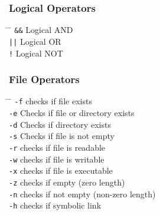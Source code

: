 \documentclass[a4paper,10pt]{article}
\begin{document}
\subsubsection*{Logical Operators}
\begin{tabbing}
	\= \hspace{30mm} \= \hspace{50mm} \kill
	\> \verb|&&| \> Logical AND \\
	\> \verb!||! \> Logical OR \\
	\> \verb|!| \> Logical NOT \\
\end{tabbing}

\subsubsection*{File Operators}
\begin{tabbing}
	\= \hspace{30mm} \= \hspace{50mm} \kill
	\> \verb|-f| \> checks if file exists \\
	\> \verb|-e| \> Checks if file or directory exists \\
	\> \verb|-d| \> Checks if directory exists \\
	\> \verb|-s| \> Checks if file is not empty \\
	\> \verb|-r| \> checks if file is readable \\
	\> \verb|-w| \> checks if file is writable \\
	\> \verb|-x| \> checks if file is executable \\
	\> \verb|-z| \> checks if empty (zero length) \\
	\> \verb|-n| \> checks if not empty (non-zero length) \\
	\> \verb|-h| \> checks if symbolic link \\
\end{tabbing}
\end{document}
